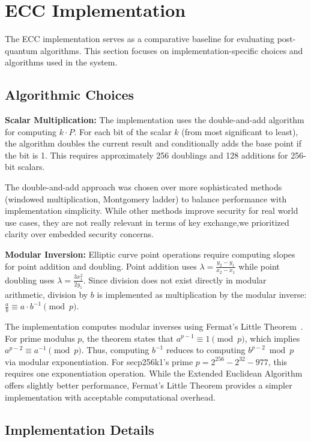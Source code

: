 \section{ECC Implementation}

The ECC implementation serves as a comparative baseline for evaluating post-quantum algorithms. This section focuses on implementation-specific choices and algorithms used in the system.

\subsection{Algorithmic Choices}

\textbf{Scalar Multiplication:} The implementation uses the double-and-add algorithm for computing $k \cdot P$. For each bit of the scalar $k$ (from most significant to least), the algorithm doubles the current result and conditionally adds the base point if the bit is 1. This requires approximately 256 doublings and 128 additions for 256-bit scalars.

The double-and-add approach was chosen over more sophisticated methods (windowed multiplication, Montgomery ladder) to balance performance with implementation simplicity. While other methods improve security for real world use cases, they are not really relevant in terms of key exchange,we prioritized clarity over embedded security concerns.

\textbf{Modular Inversion:} Elliptic curve point operations require computing slopes for point addition and doubling. Point addition uses $\lambda = \frac{y_2 - y_1}{x_2 - x_1}$ while point doubling uses $\lambda = \frac{3x_1^2}{2y_1}$. Since division does not exist directly in modular arithmetic, division by $b$ is implemented as multiplication by the modular inverse: $\frac{a}{b} \equiv a \cdot b^{-1} \pmod{p}$.

The implementation computes modular inverses using Fermat's Little Theorem~\cite{long_number_theory}. For prime modulus $p$, the theorem states that $a^{p-1} \equiv 1 \pmod{p}$, which implies $a^{p-2} \equiv a^{-1} \pmod{p}$. Thus, computing $b^{-1}$ reduces to computing $b^{p-2} \bmod p$ via modular exponentiation. For secp256k1's prime $p = 2^{256} - 2^{32} - 977$, this requires one exponentiation operation. While the Extended Euclidean Algorithm offers slightly better performance, Fermat's Little Theorem provides a simpler implementation with acceptable computational overhead.

\subsection{Implementation Details}

